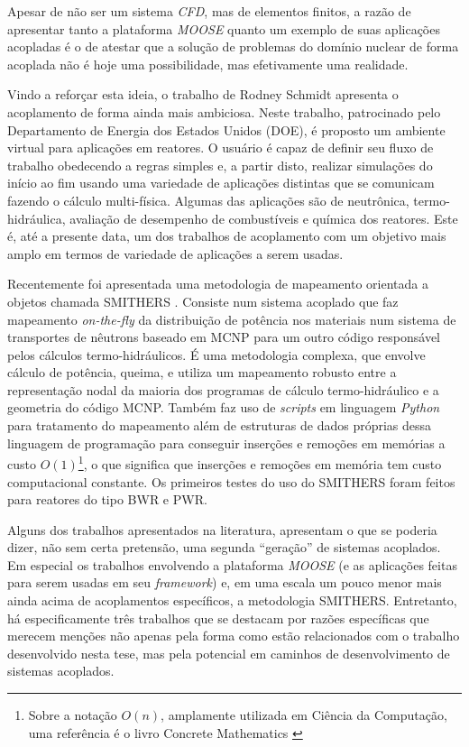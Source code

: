 Apesar de não ser um sistema \textit{CFD}, mas de elementos finitos, a razão de
apresentar tanto a plataforma \textit{MOOSE} quanto um exemplo de suas aplicações
acopladas é o de atestar que a solução de problemas do domínio nuclear de forma
acoplada não é hoje uma possibilidade, mas efetivamente uma realidade.

Vindo a reforçar esta ideia, o trabalho de Rodney Schmidt \cite{Schmidt2015} apresenta o acoplamento
de forma ainda mais ambiciosa. Neste trabalho, patrocinado pelo Departamento de Energia dos Estados
Unidos (DOE), é proposto um ambiente virtual para aplicações em reatores. O usuário é capaz de definir
seu fluxo de trabalho obedecendo a regras simples e, a partir disto, realizar simulações do início ao
fim usando uma variedade de aplicações distintas que se comunicam fazendo o cálculo multi-física. Algumas
das aplicações são de neutrônica, termo-hidráulica, avaliação de desempenho de combustíveis e química
dos reatores. Este é, até a presente data, um dos trabalhos de acoplamento com um objetivo mais amplo
em termos de variedade de aplicações a serem usadas.

Recentemente foi apresentada uma metodologia de mapeamento orientada a objetos chamada
SMITHERS \cite{Richard2015}. Consiste num sistema acoplado que faz mapeamento \textit{on-the-fly}
da distribuição de potência nos materiais num sistema de transportes de nêutrons baseado
em MCNP para um outro código responsável pelos cálculos termo-hidráulicos. É uma metodologia
complexa, que envolve cálculo de potência, queima, e utiliza um mapeamento robusto entre
a representação nodal da maioria dos programas de cálculo termo-hidráulico e a geometria
do código MCNP. Também faz uso de \textit{scripts} em linguagem \textit{Python} para
tratamento do mapeamento além de estruturas de dados próprias dessa linguagem de programação
para conseguir inserções e remoções em memórias a custo $O(1)$\footnote{Sobre a notação $O(n)$, amplamente utilizada em Ciência da Computação, uma
  referência é o livro Concrete Mathematics \cite[Seção~9.2]{Graham1994}}, o que significa
que inserções e remoções em memória tem custo computacional constante.
Os primeiros testes do uso do SMITHERS foram feitos para reatores do tipo BWR e
PWR.

Alguns dos trabalhos apresentados na literatura, apresentam o que se poderia dizer,
não sem certa pretensão, uma segunda ``geração'' de sistemas acoplados. Em especial os trabalhos
envolvendo a plataforma \textit{MOOSE} (e as aplicações feitas para serem usadas em seu
\textit{framework}) e, em uma escala um pouco menor mais ainda acima de acoplamentos específicos,
a metodologia SMITHERS. Entretanto, há especificamente três trabalhos que se destacam por razões específicas que
merecem menções não apenas pela forma como estão relacionados com o trabalho desenvolvido nesta tese, mas pela
potencial em caminhos de desenvolvimento de sistemas acoplados.

